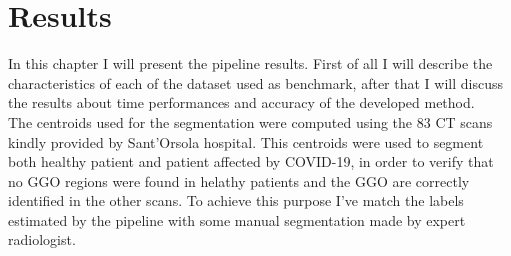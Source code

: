 \documentclass{standalone}
\begin{document}
	\chapter{Results}
	
	In this chapter I will present the pipeline results. First of all I will describe the characteristics of each of the dataset used as benchmark, after that I will discuss the results about time performances and accuracy of the developed method.\\
	The centroids used for the segmentation were computed using the 83 CT scans kindly provided by Sant'Orsola hospital.
	This centroids were used to segment both healthy patient and patient affected by COVID-19, in order to verify that no GGO regions were found in helathy patients and the GGO are correctly identified in the other scans. To achieve this purpose I've match the labels estimated by the pipeline with some manual segmentation made by expert radiologist.
\end{document}
